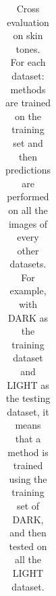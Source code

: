 \begin{table}[ht]
{\begin{tabular}{clcccccc}
    \bottomrule
    \end{tabular}}
    \caption{Cross evaluation on skin tones.\\
        For each dataset: methods are trained on the training set and then predictions are performed on all the images of every other datasets.\\
        For example, with DARK as the training dataset and LIGHT as the testing dataset, it means that a method is trained using the training set of DARK, and then tested on all the LIGHT dataset.}
    \label{tab:cross-skin-tones}
\end{table}

\begin{figure}[h]
     \centering
     
\end{figure}
